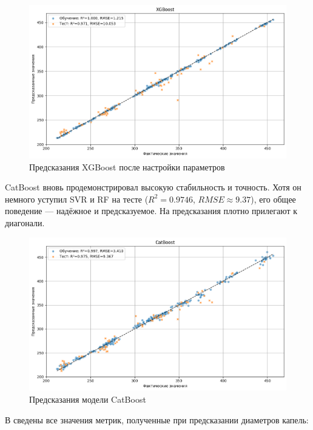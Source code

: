 \begin{figure}[htbp!]
	\centering
	\includegraphics[width=.9\linewidth]{my_folder/images/droplet_size/XGBoost.png}
	\caption{Предсказания XGBoost после настройки параметров} 
	\label{fig:droplet-size-xgboost}  
\end{figure}

\newpage

CatBoost вновь продемонстрировал высокую стабильность и точность. Хотя он немного уступил SVR и RF на тесте ($R^2 = 0.9746$, $RMSE \approx 9.37$), его общее поведение --- надёжное и предсказуемое. На  предсказания плотно прилегают к диагонали.

\begin{figure}[htbp!]
	\centering
	\includegraphics[width=.9\linewidth]{my_folder/images/droplet_size/CatBoost.png}
	\caption{Предсказания модели CatBoost} 
	\label{fig:droplet-size-catboost}  
\end{figure}

В  сведены все значения метрик, полученные при предсказании диаметров капель:

